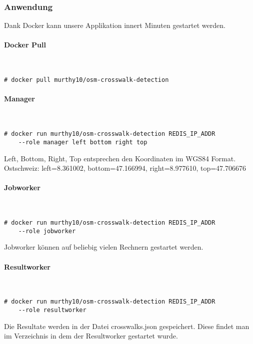 \newpage
\subsubsection{Anwendung}
Dank Docker kann unsere Applikation innert Minuten gestartet werden.

\paragraph{Docker Pull}\mbox{}\\
\begin{lstlisting}[style=BashInputStyle]
	# docker pull murthy10/osm-crosswalk-detection
\end{lstlisting}

\paragraph{Manager}\mbox{}\\
\begin{lstlisting}[style=BashInputStyle]
	# docker run murthy10/osm-crosswalk-detection REDIS_IP_ADDR 
 	--role manager left bottom right top
\end{lstlisting}
Left, Bottom, Right, Top entsprechen den Koordinaten im WGS84 Format. \\
Ostschweiz: left=8.361002, bottom=47.166994, right=8.977610, top=47.706676

\paragraph{Jobworker}\mbox{}\\
\begin{lstlisting}[style=BashInputStyle]
	# docker run murthy10/osm-crosswalk-detection REDIS_IP_ADDR 
 	--role jobworker
\end{lstlisting}
Jobworker können auf beliebig vielen Rechnern gestartet werden.\\

\paragraph{Resultworker}\mbox{}\\
\begin{lstlisting}[style=BashInputStyle]
	# docker run murthy10/osm-crosswalk-detection REDIS_IP_ADDR 
 	--role resultworker
\end{lstlisting}
Die Resultate werden in der Datei crosswalks.json gespeichert. Diese findet man im Verzeichnis in dem der Resultworker gestartet wurde.
\newpage

